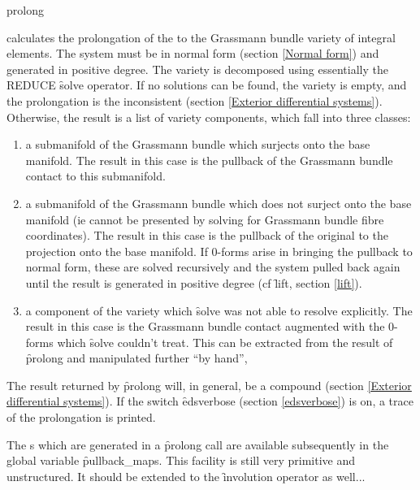 \begin{syntax}
	prolong 
\end{syntax}
calculates the prolongation of the  to the Grassmann bundle
variety of integral elements. The system must be in normal form (section
\ref{Normal form}) and generated in positive degree. The variety is
decomposed using essentially the REDUCE \f{solve} operator. If no solutions
can be found, the variety is empty, and the prolongation is the
inconsistent  (section \ref{Exterior differential
systems}). Otherwise, the result is a list of variety components, which
fall into three classes:
\begin{enumerate}
\item a submanifold of the Grassmann bundle which surjects onto the base
      manifold. The result in this case is the pullback of the Grassmann
      bundle contact  to this submanifold.
\item a submanifold of the Grassmann bundle which does not surject onto the
      base manifold (ie cannot be presented by solving for Grassmann
      bundle fibre coordinates). The result in this case is the pullback of
      the original  to the projection onto the base manifold. If
      0-forms arise in bringing the pullback to normal form, these are
      solved recursively and the system pulled back again until the result
      is generated in positive degree (cf \f{lift}, section \ref{lift}).
\item a component of the variety which \f{solve} was not able to resolve
      explicitly. The result in this case is the Grassmann bundle contact
       augmented with the 0-forms which \f{solve} couldn't
      treat. This can be extracted from the result of \f{prolong} and
      manipulated further ``by hand'',
\end{enumerate}
The result returned by \f{prolong} will, in general, be a compound
 (section \ref{Exterior differential systems}). If the switch
\f{edsverbose} (section \ref{edsverbose}) is on, a trace of the
prolongation is printed.

The s which are generated in a \f{prolong} call are available
subsequently in the global variable \f{pullback\_maps}. This facility is
still very primitive and unstructured. It should be extended to the
\f{involution} operator as well...

